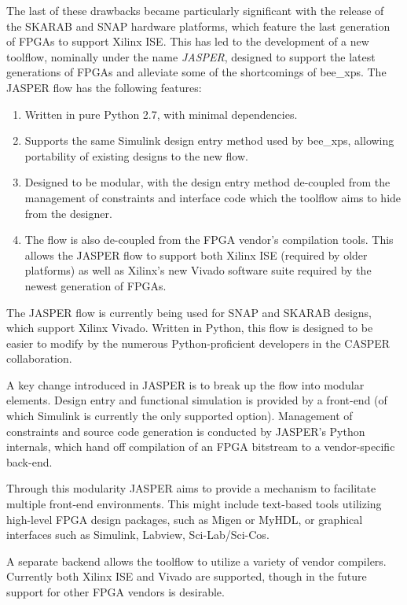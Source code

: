 \documentclass{ws-jai}
\begin{document}
The last of these drawbacks became particularly significant with the release of the SKARAB and SNAP hardware platforms, which feature the last generation of FPGAs to support Xilinx ISE. This has led to the development of a new toolflow, nominally under the name \emph{JASPER}, designed to support the latest generations of FPGAs and alleviate some of the shortcomings of bee\_xps.
The JASPER flow has the following features:
\begin{enumerate}
 \item Written in pure Python 2.7, with minimal dependencies.
 \item Supports the same Simulink design entry method used by bee\_xps, allowing portability of existing designs to the new flow.
 \item Designed to be modular, with the design entry method de-coupled from the management of constraints and interface code which the toolflow aims to hide from the designer.
 \item The flow is also de-coupled from the FPGA vendor's compilation tools. This allows the JASPER flow to support both Xilinx ISE (required by older platforms) as well as Xilinx's new Vivado software suite required by the newest generation of FPGAs.
\end{enumerate}

The JASPER flow is currently being used for SNAP and SKARAB designs, which support Xilinx Vivado. Written in Python, this flow is designed to be easier to modify by the numerous Python-proficient developers in the CASPER collaboration.

A key change introduced in JASPER is to break up the flow into modular elements. Design entry and functional simulation is provided by a front-end (of which Simulink is currently the only supported option). Management of constraints and source code generation is conducted by JASPER's Python internals, which hand off compilation of an FPGA bitstream to a vendor-specific back-end.
 
Through this modularity JASPER aims to provide a mechanism to facilitate multiple front-end environments. This might include text-based tools utilizing high-level FPGA design packages, such as Migen or MyHDL, or graphical interfaces such as Simulink, Labview, Sci-Lab/Sci-Cos.

A separate backend allows the toolflow to utilize a variety of vendor compilers. Currently both Xilinx ISE and Vivado are supported, though in the future support for other FPGA vendors is desirable.
\end{document}
